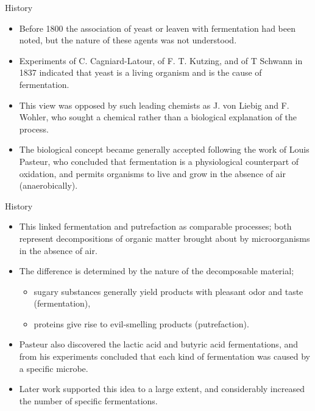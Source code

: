 \documentclass[
  ignorenonframetext,
  aspectratio=169]{beamer}
\providecommand{\tightlist}{%
  \setlength{\itemsep}{0pt}\setlength{\parskip}{0pt}}
\begin{document}
\begin{frame}{History}
\protect\hypertarget{history-1}{}
\begin{itemize}
\tightlist
\item
  Before 1800 the association of yeast or leaven with fermentation had
  been noted, but the nature of these agents was not understood.
\item
  Experiments of C. Cagniard-Latour, of F. T. Kutzing, and of T Schwann
  in 1837 indicated that yeast is a living organism and is the cause of
  fermentation.
\item
  This view was opposed by such leading chemists as J. von Liebig and F.
  Wohler, who sought a chemical rather than a biological explanation of
  the process.
\item
  The biological concept became generally accepted following the work of
  Louis Pasteur, who concluded that fermentation is a physiological
  counterpart of oxidation, and permits organisms to live and grow in
  the absence of air (anaerobically).
\end{itemize}
\end{frame}

\begin{frame}{History}
\protect\hypertarget{history-2}{}
\begin{itemize}
\tightlist
\item
  This linked fermentation and putrefaction as comparable processes;
  both represent decompositions of organic matter brought about by
  microorganisms in the absence of air.
\item
  The difference is determined by the nature of the decomposable
  material;

  \begin{itemize}
  \tightlist
  \item
    sugary substances generally yield products with pleasant odor and
    taste (fermentation),
  \item
    proteins give rise to evil-smelling products (putrefaction).
  \end{itemize}
\item
  Pasteur also discovered the lactic acid and butyric acid
  fermentations, and from his experiments concluded that each kind of
  fermentation was caused by a specific microbe.
\item
  Later work supported this idea to a large extent, and considerably
  increased the number of specific fermentations.
\end{itemize}
\end{frame}
\end{document}
